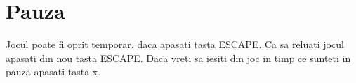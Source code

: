 \hypertarget{group__group__pauza}{}\section{Pauza}
\label{group__group__pauza}
Jocul poate fi oprit temporar, daca apasati tasta E\+S\+C\+A\+PE. Ca sa reluati jocul apasati din nou tasta E\+S\+C\+A\+PE. Daca vreti sa iesiti din joc in timp ce sunteti in pauza apasati tasta \textquotesingle{}x\textquotesingle{}. 